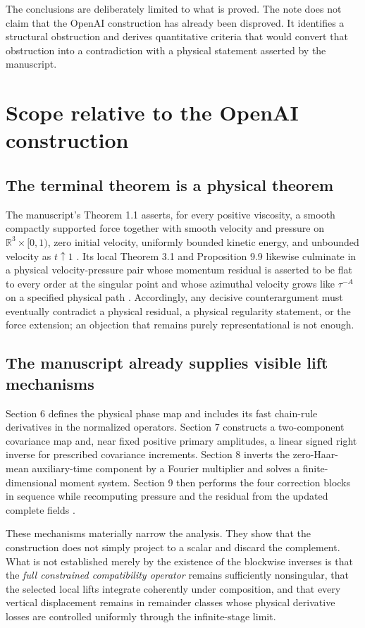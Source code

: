 \documentclass[12pt]{article}
\newcommand{\R}{\mathbb R}
\begin{document}
The conclusions are deliberately limited to what is proved. The note does not claim that the OpenAI construction has already been disproved. It identifies a structural obstruction and derives quantitative criteria that would convert that obstruction into a contradiction with a physical statement asserted by the manuscript.

\section{Scope relative to the OpenAI construction}
\subsection{The terminal theorem is a physical theorem}
The manuscript's Theorem 1.1 asserts, for every positive viscosity, a smooth compactly supported force together with smooth velocity and pressure on $\R^3\times[0,1)$, zero initial velocity, uniformly bounded kinetic energy, and unbounded velocity as $t\uparrow1$ \cite[Theorem 1.1]{OpenAI2026}. Its local Theorem 3.1 and Proposition 9.9 likewise culminate in a physical velocity-pressure pair whose momentum residual is asserted to be flat to every order at the singular point and whose azimuthal velocity grows like $\tau^{-A}$ on a specified physical path \cite[Theorem 3.1 and Proposition 9.9]{OpenAI2026}. Accordingly, any decisive counterargument must eventually contradict a physical residual, a physical regularity statement, or the force extension; an objection that remains purely representational is not enough.

\subsection{The manuscript already supplies visible lift mechanisms}
Section 6 defines the physical phase map and includes its fast chain-rule derivatives in the normalized operators. Section 7 constructs a two-component covariance map and, near fixed positive primary amplitudes, a linear signed right inverse for prescribed covariance increments. Section 8 inverts the zero-Haar-mean auxiliary-time component by a Fourier multiplier and solves a finite-dimensional moment system. Section 9 then performs the four correction blocks in sequence while recomputing pressure and the residual from the updated complete fields \cite[Secs. 6.1, 7.3--7.4, 8.5--8.6, and 9.3]{OpenAI2026}.

These mechanisms materially narrow the analysis. They show that the construction does not simply project to a scalar and discard the complement. What is not established merely by the existence of the blockwise inverses is that the \emph{full constrained compatibility operator} remains sufficiently nonsingular, that the selected local lifts integrate coherently under composition, and that every vertical displacement remains in remainder classes whose physical derivative losses are controlled uniformly through the infinite-stage limit.
\end{document}
